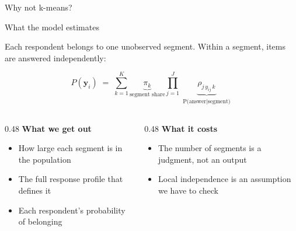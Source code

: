 \documentclass[
  ignorenonframetext,
  aspectratio=169,
]{beamer}
\newcommand{\kicker}[1]{\par\noindent{\footnotesize\color{vteal}\textbf{\MakeUppercase{#1}}}\par\vspace{0.4em}}
\begin{document}
\begin{frame}[shrink]{Why not k-means?}
\end{frame}

\begin{frame}[shrink]{What the model estimates}
\label{what-the-model-estimates}
\kicker{method, part one}

\small

Each respondent belongs to one unobserved segment. Within a segment,
items are answered independently:

\[
P(\mathbf{y}_i) \;=\; \sum_{k=1}^{K} \underbrace{\pi_k}_{\text{segment share}} \prod_{j=1}^{J} \underbrace{\rho_{j\,y_{ij}\,k}}_{\substack{\text{P(answer} \mid \text{segment)}}}
\]

\vspace{0.4em}

\begin{columns}[T]
\begin{column}{0.48\textwidth}
\textbf{What we get out}
\begin{itemize}\itemsep2pt
  \item How large each segment is in the population
  \item The full response profile that defines it
  \item Each respondent's probability of belonging
\end{itemize}
\end{column}
\begin{column}{0.48\textwidth}
\textbf{What it costs}
\begin{itemize}\itemsep2pt
  \item The number of segments is a judgment, not an output
  \item Local independence is an assumption we have to check
\end{itemize}
\end{column}
\end{columns}

\end{frame}
\end{document}
